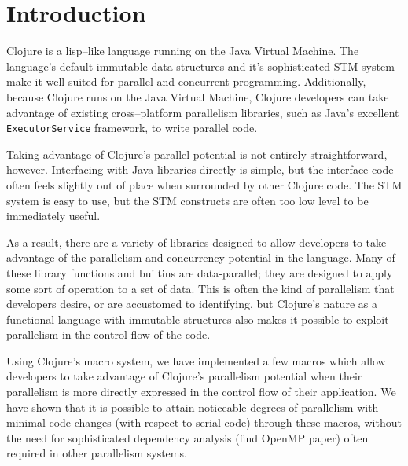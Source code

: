 \documentclass{sig-alternate}
\def\code#1{\mbox{\texttt{#1}}}
\begin{document}
\section{Introduction}
Clojure is a lisp--like language running on the Java Virtual Machine.
The language's default immutable data structures and it's sophisticated STM system make it well suited for parallel and concurrent programming.
Additionally, because Clojure runs on the Java Virtual Machine, Clojure developers can take advantage of existing cross--platform parallelism libraries, such as Java's excellent \code{ExecutorService} framework, to write parallel code.

Taking advantage of Clojure's parallel potential is not entirely straightforward, however.
Interfacing with Java libraries directly is simple, but the interface code often feels slightly out of place when surrounded by other Clojure code.
The STM system is easy to use, but the STM constructs are often too low level to be immediately useful.

As a result, there are a variety of libraries designed to allow developers to take advantage of the parallelism and concurrency potential in the language.
Many of these library functions and builtins are data-parallel; they are designed to apply some sort of operation to a set of data.
This is often the kind of parallelism that developers desire, or are accustomed to identifying, but Clojure's nature as a functional language with immutable structures also makes it possible to exploit parallelism in the control flow of the code.

Using Clojure's macro system, we have implemented a few macros which allow developers to take advantage of Clojure's parallelism potential when their parallelism is more directly expressed in the control flow of their application.
We have shown that it is possible to attain noticeable degrees of parallelism with minimal code changes (with respect to serial code) through these macros, without the need for sophisticated dependency analysis (find OpenMP paper) often required in other parallelism systems.
\end{document}
